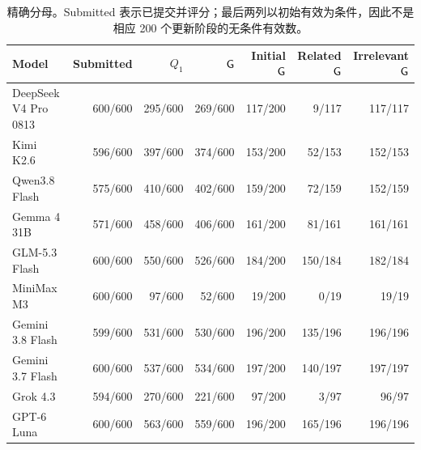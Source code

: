 \begin{table}[t]
\centering\small\setlength{\tabcolsep}{5pt}
\begin{tabular}{lrrrrrr}
\toprule
Model & Submitted & $Q_1$ & $\mathsf{G}$ & Initial $\mathsf{G}$ & Related $\mathsf{G}$ & Irrelevant $\mathsf{G}$ \\
\midrule
DeepSeek V4 Pro 0813 & 600/600 & 295/600 & 269/600 & 117/200 & 9/117 & 117/117 \\
Kimi K2.6 & 596/600 & 397/600 & 374/600 & 153/200 & 52/153 & 152/153 \\
Qwen3.8 Flash & 575/600 & 410/600 & 402/600 & 159/200 & 72/159 & 152/159 \\
Gemma 4 31B & 571/600 & 458/600 & 406/600 & 161/200 & 81/161 & 161/161 \\
GLM-5.3 Flash & 600/600 & 550/600 & 526/600 & 184/200 & 150/184 & 182/184 \\
MiniMax M3 & 600/600 & 97/600 & 52/600 & 19/200 & 0/19 & 19/19 \\
Gemini 3.8 Flash & 599/600 & 531/600 & 530/600 & 196/200 & 135/196 & 196/196 \\
Gemini 3.7 Flash & 600/600 & 537/600 & 534/600 & 197/200 & 140/197 & 197/197 \\
Grok 4.3 & 594/600 & 270/600 & 221/600 & 97/200 & 3/97 & 96/97 \\
GPT-6 Luna & 600/600 & 563/600 & 559/600 & 196/200 & 165/196 & 196/196 \\
\bottomrule\end{tabular}
\caption{精确分母。Submitted 表示已提交并评分；最后两列以初始有效为条件，因此不是相应 200 个更新阶段的无条件有效数。}
\label{tab:zh_counts}\end{table}